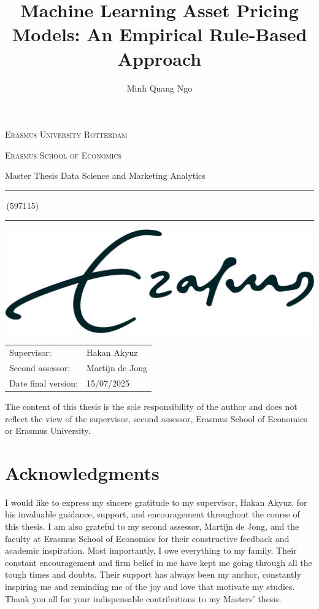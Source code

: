 \documentclass[a4paper,11pt]{article}
\author{Minh Quang Ngo}
\title{Machine Learning Asset Pricing Models: An Empirical Rule-Based Approach}
\newcommand{\studentnumber}{597115}
\newcommand{\program}{Data Science and Marketing Analytics}
\newcommand{\supervisor}{Hakan Akyuz}
\newcommand{\secondassesor}{Martijn de Jong}
\begin{document}
\begin{titlepage}
\makeatletter
\begin{center}
	\textsc{Erasmus University Rotterdam}
	\par \textsc{Erasmus School of Economics}
	\par Master Thesis \program

	\vfill \hrule height .08em \bigskip
	\par\huge\@title\bigskip
	\par\Large\@author\,(\studentnumber)\bigskip
	\hrule height .08em\normalsize
	
	\vfill
	\includegraphics[width=\textwidth,height=0.15\textheight,keepaspectratio]{eur} %
	\vfill
	
	\begin{tabular}{ll}
		\toprule
		Supervisor: & \supervisor\\
		Second assessor: & \secondassesor\\
		Date final version: & 15/07/2025\\
		\bottomrule
	\end{tabular}
	
	\vfill
	The content of this thesis is the sole responsibility of the author and does not reflect the view of the supervisor, second assessor, Erasmus School of Economics or Erasmus University.
\end{center}
\makeatother
\end{titlepage}

\newpage
\section*{Acknowledgments}
I would like to express my sincere gratitude to my supervisor, Hakan Akyuz, for his invaluable guidance, support, and encouragement throughout the course of this thesis. I am also grateful to my second assessor, Martijn de Jong, and the faculty at Erasmus School of Economics for their constructive feedback and academic inspiration. Most importantly, I owe everything to my family. Their constant encouragement and firm belief in me have kept me going through all the tough times and doubts. Their support has always been my anchor, constantly inspiring me and reminding me of the joy and love that motivate my studies. Thank you all for your indispensable contributions to my Masters' thesis.
\end{document}
